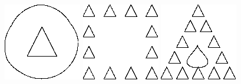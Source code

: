 \begin{figure}[p]
\centering
\includegraphics[width=.3\linewidth]{ext/images/embedd.png}
\quad
\includegraphics[width=.3\linewidth]{ext/images/comp.png}
\quad
\includegraphics[width=.3\linewidth]{ext/images/comp_and_embed.png}

\vspace{1cm}


\end{figure}
